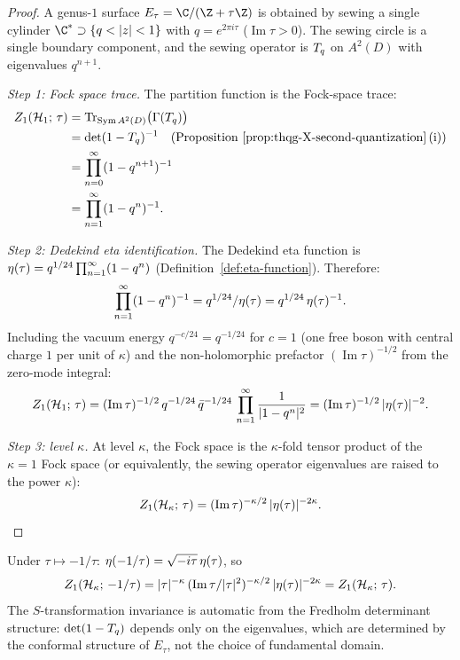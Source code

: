 \begin{proof}
A genus-$1$ surface $E_\tau = \C/(\Z + \tau\Z)$ is obtained
by sewing a single cylinder $\C^* \supset
\{q < |z| < 1\}$ with $q = e^{2\pi i \tau}$ ($\operatorname{Im}\tau > 0$).
The sewing circle is a single boundary component, and the
sewing operator is $T_q$ on $A^2(D)$ with eigenvalues
$q^{n+1}$.

\emph{Step 1: Fock space trace.}
The partition function is the Fock-space trace:
\begin{align}
Z_1(\mathcal{H}_1;\,\tau)
&= \operatorname{Tr}_{\operatorname{Sym} A^2(D)}
\bigl(\Gamma(T_q)\bigr)
\notag\\
&= \det(1 - T_q)^{-1}
\quad\text{(Proposition~\ref{prop:thqg-X-second-quantization}\,(i))}
\notag\\
&= \prod_{n=0}^{\infty}
(1 - q^{n+1})^{-1}
\notag\\
&= \prod_{n=1}^{\infty}
(1 - q^n)^{-1}.
\label{eq:thqg-X-genus-1-product}
\end{align}

\emph{Step 2: Dedekind eta identification.}
The Dedekind eta function is
$\eta(\tau) = q^{1/24}\prod_{n=1}^{\infty}(1-q^n)$
(Definition~\ref{def:eta-function}). Therefore:
\begin{equation}\label{eq:thqg-X-eta-identification}
\prod_{n=1}^{\infty}(1-q^n)^{-1}
= q^{1/24} / \eta(\tau)
= q^{1/24}\,\eta(\tau)^{-1}.
\end{equation}
Including the vacuum energy $q^{-c/24} = q^{-1/24}$ for
$c = 1$ (one free boson with central charge $1$ per unit of
$\kappa$) and the non-holomorphic prefactor
$(\operatorname{Im}\tau)^{-1/2}$ from the zero-mode
integral:
\[
Z_1(\mathcal{H}_1;\,\tau)
= (\operatorname{Im}\tau)^{-1/2}\,
q^{-1/24}\,\bar{q}^{-1/24}\,
\prod_{n=1}^{\infty}
\frac{1}{|1-q^n|^2}
= (\operatorname{Im}\tau)^{-1/2}\,
|\eta(\tau)|^{-2}.
\]

\emph{Step 3: level $\kappa$.}
At level $\kappa$, the Fock space is the $\kappa$-fold tensor
product of the $\kappa = 1$ Fock space (or equivalently, the
sewing operator eigenvalues are raised to the power $\kappa$):
\[
Z_1(\mathcal{H}_\kappa;\,\tau)
= (\operatorname{Im}\tau)^{-\kappa/2}\,
|\eta(\tau)|^{-2\kappa}.
\qedhere
\]
\end{proof}

\begin{remark}%
\label{rem:thqg-X-genus-1-modular}%
Under $\tau \mapsto -1/\tau$:
$\eta(-1/\tau) = \sqrt{-i\tau}\,\eta(\tau)$, so
\[
Z_1(\mathcal{H}_\kappa;\,-1/\tau)
= |\tau|^{-\kappa}\,
(\operatorname{Im}\tau/|\tau|^2)^{-\kappa/2}\,
|\eta(\tau)|^{-2\kappa}
= Z_1(\mathcal{H}_\kappa;\,\tau).
\]
The $S$-transformation invariance is automatic from the
Fredholm determinant structure: $\det(1 - T_q)$ depends
only on the eigenvalues, which are determined by the conformal
structure of $E_\tau$, not the choice of fundamental domain.
\end{remark}

